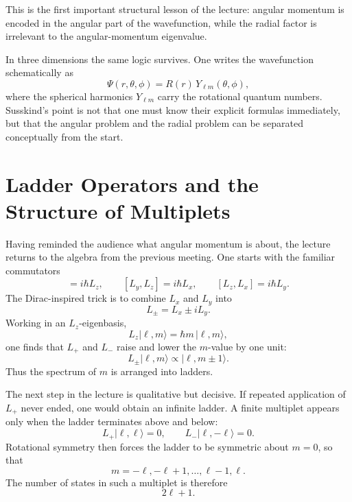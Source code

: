 This is the first important structural lesson of the lecture: angular momentum is encoded in the angular part of the wavefunction, while the radial factor is irrelevant to the angular-momentum eigenvalue.

In three dimensions the same logic survives. One writes the wavefunction schematically as
\begin{equation}
\Psi(r,\theta,\phi)=R(r)\,Y_{\ell m}(\theta,\phi),
\end{equation}
where the spherical harmonics \(Y_{\ell m}\) carry the rotational quantum numbers. Susskind's point is not that one must know their explicit formulas immediately, but that the angular problem and the radial problem can be separated conceptually from the start.

\section{Ladder Operators and the Structure of Multiplets}

Having reminded the audience what angular momentum is about, the lecture returns to the algebra from the previous meeting. One starts with the familiar commutators
\begin{equation}
[L_x,L_y]=i\hbar L_z,\qquad
[L_y,L_z]=i\hbar L_x,\qquad
[L_z,L_x]=i\hbar L_y.
\end{equation}
The Dirac-inspired trick is to combine \(L_x\) and \(L_y\) into
\begin{equation}
L_\pm=L_x\pm iL_y.
\end{equation}
Working in an \(L_z\)-eigenbasis,
\begin{equation}
L_z|\ell,m\rangle=\hbar m\,|\ell,m\rangle,
\end{equation}
one finds that \(L_+\) and \(L_-\) raise and lower the \(m\)-value by one unit:
\begin{equation}
L_\pm|\ell,m\rangle \propto |\ell,m\pm 1\rangle.
\end{equation}
Thus the spectrum of \(m\) is arranged into ladders.

The next step in the lecture is qualitative but decisive. If repeated application of \(L_+\) never ended, one would obtain an infinite ladder. A finite multiplet appears only when the ladder terminates above and below:
\begin{equation}
L_+|\ell,\ell\rangle=0,\qquad
L_-|\ell,-\ell\rangle=0.
\end{equation}
Rotational symmetry then forces the ladder to be symmetric about \(m=0\), so that
\begin{equation}
m=-\ell,-\ell+1,\dots,\ell-1,\ell.
\end{equation}
The number of states in such a multiplet is therefore
\begin{equation}
2\ell+1.
\end{equation}

